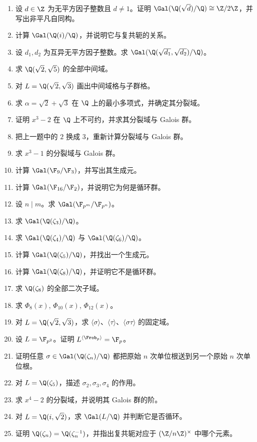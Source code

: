 \begin{enumerate}[label=\textbf{习题12.\arabic*.}, leftmargin=*, itemsep=0.75em]
\item \basic 设 $d\in\Z$ 为无平方因子整数且 $d\neq1$。证明 $\Gal(\Q(\sqrt d)/\Q)\cong\Z/2\Z$，并写出非平凡自同构。
\item \basic 计算 $\Gal(\Q(i)/\Q)$，并说明它与复共轭的关系。
\item \basic 设 $d_1,d_2$ 为互异无平方因子整数。求 $\Gal(\Q(\sqrt{d_1},\sqrt{d_2})/\Q)$。
\item \basic 求 $\Q(\sqrt2,\sqrt5)$ 的全部中间域。
\item \basic 对 $L=\Q(\sqrt2,\sqrt3)$ 画出中间域格与子群格。
\item \basic 求 $\alpha=\sqrt2+\sqrt3$ 在 $\Q$ 上的最小多项式，并确定其分裂域。
\item \basic 证明 $x^3-2$ 在 $\Q$ 上不可约，并求其分裂域与 Galois 群。
\item \basic 把上一题中的 $2$ 换成 $3$，重新计算分裂域与 Galois 群。
\item \basic 求 $x^3-1$ 的分裂域与 Galois 群。
\item \basic 计算 $\Gal(\F_9/\F_3)$，并写出其生成元。
\item \basic 计算 $\Gal(\F_{16}/\F_2)$，并说明它为何是循环群。
\item \basic 设 $n\mid m$。求 $\Gal(\F_{p^m}/\F_{p^n})$。
\item \basic 求 $\Gal(\Q(\zeta_3)/\Q)$。
\item \basic 求 $\Gal(\Q(\zeta_4)/\Q)$ 与 $\Gal(\Q(\zeta_6)/\Q)$。
\item \basic 计算 $\Gal(\Q(\zeta_5)/\Q)$，并找出一个生成元。
\item \basic 计算 $\Gal(\Q(\zeta_8)/\Q)$，并证明它不是循环群。
\item \basic 求 $\Q(\zeta_8)$ 的全部二次子域。
\item \basic 求 $\Phi_8(x)$, $\Phi_{10}(x)$, $\Phi_{12}(x)$。
\item \basic 对 $L=\Q(\sqrt2,\sqrt3)$，求 $\langle \sigma \rangle$、$\langle \tau \rangle$、$\langle \sigma\tau \rangle$ 的固定域。
\item \basic 设 $L=\F_{p^2}$。证明 $L^{\langle \Frob_p \rangle}=\F_p$。
\item \basic 证明任意 $\sigma\in\Gal(\Q(\zeta_n)/\Q)$ 都把原始 $n$ 次单位根送到另一个原始 $n$ 次单位根。
\item \basic 对 $L=\Q(\zeta_5)$，描述 $\sigma_2, \sigma_3, \sigma_4$ 的作用。
\item \basic 求 $x^4-2$ 的分裂域，并说明其 Galois 群的阶。
\item \basic 对 $L=\Q(i,\sqrt2)$，求 $\Gal(L/\Q)$ 并判断它是否循环。
\item \basic 证明 $\Q(\zeta_n)=\Q(\zeta_n^{-1})$，并指出复共轭对应于 $(\Z/n\Z)^\times$ 中哪个元素。
\end{enumerate}

